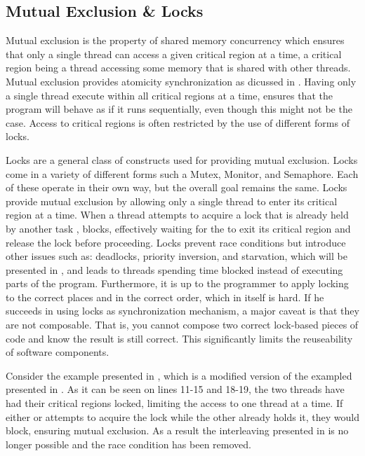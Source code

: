 \subsection{Mutual Exclusion \& Locks}\label{sec:locks_me}
Mutual exclusion is the property of shared memory concurrency which ensures that only a single thread can access a given critical region at a time\cite[p. 117]{tanenbaum2008modern}\cite[p. 962]{bryant2011computer}\cite[p. 6]{herlihy2012art}, a critical region being a thread accessing some memory that is shared with other threads\cite[p. 117]{tanenbaum2008modern}\cite[p. 961]{bryant2011computer}. Mutual exclusion provides atomicity synchronization as dicussed in . Having only a single thread execute within all critical regions at a time, ensures that the program will behave as if it runs sequentially, even though this might not be the case. Access to critical regions is often restricted by the use of different forms of locks\cite[p. 58]{sutter2005software}. 

Locks are a general class of constructs used for providing mutual exclusion. Locks come in a variety of different forms such a Mutex, Monitor, and Semaphore. Each of these operate in their own way, but the overall goal remains the same. Locks provide mutual exclusion by allowing only a single thread to enter its critical region at a time. When a thread  attempts to acquire a lock that is already held by another task , blocks, effectively waiting for the  to exit its critical region and release the lock before proceeding. Locks prevent race conditions but introduce other issues such as: deadlocks, priority inversion, and starvation, which will be presented in , and leads to threads spending time blocked instead of executing parts of the program. Furthermore, it is up to the programmer to apply locking to the correct places and in the correct order, which in itself is hard. If he succeeds in using locks as synchronization mechanism, a major caveat is that they are not composable\cite[p. 58]{sutter2005software}. That is, you cannot compose two correct lock-based pieces of code and know the result is still correct. This significantly limits the reuseability of software components.%

Consider the example presented in , which is a modified version of the exampled presented in . As it can be seen on lines 11-15 and 18-19, the two threads have had their critical regions locked, limiting the access to one thread at a time. If either  or  attempts to acquire the lock while the other already holds it, they would block, ensuring mutual exclusion. As a result the interleaving presented in  is no longer possible and the race condition has been removed. 

